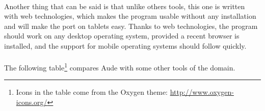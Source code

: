    
\paragraph{}
Another thing that can be said is that unlike others tools, this one is written with web technologies, which makes the program usable without any installation and will make the port on tablets easy. Thanks to web technologies, the program should work on any desktop operating system, provided a recent browser is installed, and the support for mobile operating systems should follow quickly.

   
\newpage
   
\paragraph{}
The following table\footnote{Icons in the table come from the Oxygen theme: \href{http://www.oxygen-icons.org/}{http://www.oxygen-icons.org/}} compares Aude with some other tools of the domain.

